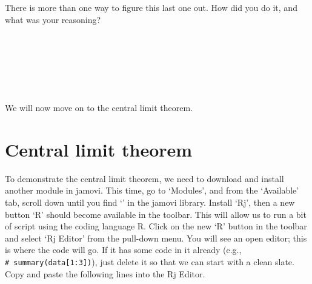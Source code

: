 \documentclass[
  openany]{krantz}
\begin{document}
There is more than one way to figure this last one out.
How did you do it, and what was your reasoning?

\begin{verbatim}






\end{verbatim}

We will now move on to the central limit theorem.

\hypertarget{central-limit-theorem}{%
\section{Central limit theorem}\label{central-limit-theorem}}

To demonstrate the central limit theorem, we need to download and install another module in jamovi.
This time, go to `Modules', and from the `Available' tab, scroll down until you find `' in the jamovi library.
Install `Rj', then a new button `R' should become available in the toolbar.
This will allow us to run a bit of script using the coding language R.
Click on the new `R' button in the toolbar and select `Rj Editor' from the pull-down menu.
You will see an open editor; this is where the code will go.
If it has some code in it already (e.g., \texttt{\#\ summary(data{[}1:3{]})}), just delete it so that we can start with a clean slate.
Copy and paste the following lines into the Rj Editor.
\end{document}

